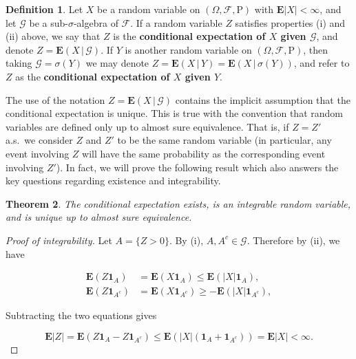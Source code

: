 \documentclass[11pt]{report}
\theoremstyle{plain}
\newtheorem{thm}{Theorem}[chapter]
\theoremstyle{definition}
\newtheorem{defn}[thm]{Definition}
\begin{document}
\begin{defn}
Let $X$ be a random variable on
$(\Omega, \mathcal{F}, \mathrm{P})$ with
$\mathbf{E}|X|<\infty$, and let $\mathcal{G}$ be a
sub-$\sigma$-algebra of $\mathcal{F}$. If a random
variable $Z$ satisfies properties (i) and (ii) above,
we say that $Z$ is the \textbf{conditional expectation of $X$
given $\mathcal{G}$}, and denote
$Z = \mathbf{E}\left(X\,|\,\mathcal{G}\right)$. If $Y$
is another random variable on
$(\Omega, \mathcal{F}, \mathrm{P})$, then taking
$\mathcal{G}=\sigma(Y)$ we may denote
$Z = \mathbf{E}\left(X\,|\,Y\right) =
\mathbf{E}\left(X\,|\,\sigma(Y)\right)$,
and refer to $Z$ as the \textbf{conditional expectation of
$X$ given $Y$}.
\end{defn}

\noindent The use of the notation
$Z = \mathbf{E}\left(X\,|\,\mathcal{G}\right)$
contains the implicit assumption that the conditional
expectation is unique. This is true with the
convention that random variables are defined only up
to almost sure equivalence. That is, if $Z=Z'$ a.s.\
we consider $Z$ and $Z'$ to be the same random
variable (in particular, any event involving $Z$ will
have the same probability as the corresponding event
involving $Z'$). In fact, we will prove the following
result which also answers the key questions regarding
existence and integrability.

\begin{thm}
\label{thm-cond-ext}
The conditional expectation exists, is an integrable
random variable, and is unique up to almost sure
equivalence.
\end{thm}

\begin{proof}[Proof of integrability]
Let $A = \{ Z>0 \}$. By (i), $A, A^c \in \mathcal{G}$.
Therefore by (ii), we have

\begin{align*}
\mathbf{E}(Z \mathbf{1}_A) &= \mathbf{E}(X \mathbf{1}_A) \le \mathbf{E}\left( |X| \mathbf{1}_A \right), \\
\mathbf{E}(Z \mathbf{1}_{A^c}) &= \mathbf{E}(X \mathbf{1}_{A^c}) \ge -\mathbf{E}\left( |X| \mathbf{1}_{A^c} \right),
\end{align*}

\noindent Subtracting the two equations gives

\[
\mathbf{E}|Z| = \mathbf{E}(Z\mathbf{1}_A - Z\mathbf{1}_{A^c}) \le \mathbf{E}\left( |X| (\mathbf{1}_A + \mathbf{1}_{A^c}) \right) = \mathbf{E}|X| < \infty.
\]

\end{proof}
\end{document}

